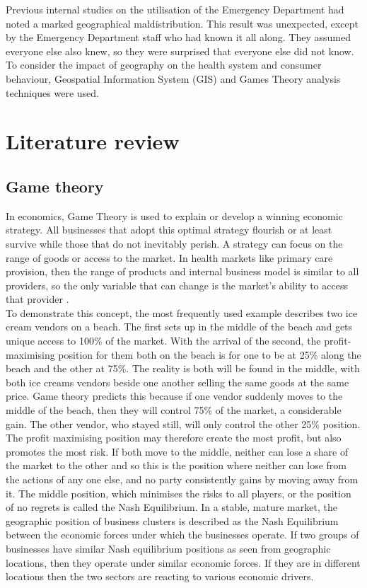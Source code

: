 \documentclass[11pt,a4paper]{article}
\begin{document}
Previous internal studies on the utilisation of the Emergency Department had noted a marked geographical maldistribution. This result was unexpected, except by the Emergency Department staff who had known it all along. They assumed everyone else also knew, so they were surprised that everyone else did not know. To consider the impact of geography on the health system and consumer behaviour, Geospatial Information System (GIS) and Games Theory analysis techniques were used.\\

\pagebreak
\section{Literature review}
\subsection{Game theory}
In economics, Game Theory is used to explain or develop a winning economic strategy. All businesses that adopt this optimal strategy flourish or at least survive while those that do not inevitably perish. A strategy can focus on the range of goods or access to the market. In health markets like primary care provision, then the range of products and internal business model is similar to all providers, so the  only variable that can change is the market's ability to access that provider \citep{dinar2008game}. \\

To demonstrate this concept, the most frequently used example describes two ice cream vendors on a beach. The first sets up in the middle of the beach and gets unique access to 100\% of the market. With the arrival of the second, the profit-maximising position for them both on the beach is for one to be at 25\% along the beach and the other at 75\%. The reality is both will be found in the middle, with both ice creams vendors beside one another selling the same goods at the same price. Game theory predicts this because if one vendor suddenly moves to the middle of the beach, then they will control 75\% of the market, a considerable gain. The other vendor, who stayed still, will only control the other 25\% position. The profit maximising position may therefore create the most profit, but also promotes the most risk. If both move to the middle, neither can lose a share of the market to the other and so this is the position where neither can lose from the actions of any one else, and no party consistently gains by moving away from it. The middle position, which minimises the risks to all players, or the position of no regrets is called the Nash Equilibrium. In a stable, mature market, the geographic position of business clusters is described as  the Nash Equilibrium between the economic forces under which the businesses operate. If two groups of businesses have similar Nash equilibrium positions as seen from geographic locations, then they operate under similar economic forces. If they are in different locations then the two sectors are reacting to various economic drivers. \\
\end{document}
